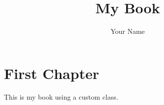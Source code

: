 \documentclass{mybook}
\begin{document}
\frontmatter
\title{My Book}
\author{Your Name}
\maketitle

\mainmatter
\chapter{First Chapter}
This is my book using a custom class.
\end{document}
